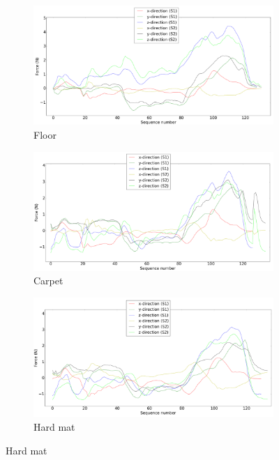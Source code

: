 \documentclass[USenglish]{ifimaster}  %
\begin{document}
\begin{figure} [h]
	\centering
	\begin{subfigure}[b]{\textwidth}
			\includegraphics[width=\textwidth,height=\textheight,keepaspectratio]{Figures/s1gulv2}
			\caption{Floor}
			\label{fig:s1gulv2} 
		\end{subfigure}
		
		\begin{subfigure}[b]{\textwidth}
			\includegraphics[width=\textwidth,height=\textheight,keepaspectratio]{Figures/s1teppe}
			\caption{Carpet}
			\label{fig:s1teppe}
		\end{subfigure}
		
		\begin{subfigure}[h]{\textwidth}
			\includegraphics[width=\textwidth,height=\textheight,keepaspectratio]{Figures/s1hardmatte}
			\caption{Hard mat}
			\label{fig:s1hardmatte}
		\end{subfigure}
		\end{figure}
\end{document}
